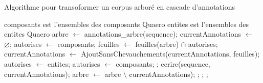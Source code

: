 \documentclass[PhD-Yoann-Dupont.tex]{subfiles}
\begin{document}
\begin{algorithm}[ht!]
\caption{Algorithme pour transoformer un corpus arboré en cascade d'annotations}
\label{alg:CorpusTreeToCascade}
\begin{algorithmic}
    \State \Comment composants est l'ensembles des composants Quaero
    \State \Comment entites est l'ensembles des entites Quaero
        \State arbre $\gets$ annotations\_arbre(sequence);
        \State currentAnnotations $\gets$ $\varnothing$;
        \State autorises $\gets$ composants;
            \State feuilles $\gets$ feuilles(arbre) $\cap$ autorises;
            \State currentAnnotations $\gets$ AjoutSansChevauchements(currentAnnotations, feuilles);
                \State autorises $\gets$ entites;
            \Else
                \State autorises $\gets$ composants;
            \EndIf;
            \State ecrire(sequence, currentAnnotations);
            \State arbre $\gets$ arbre $\setminus$ currentAnnotations);
        \EndWhile;
    \EndFor;
    \EndFunction;
\end{algorithmic}
\end{algorithm}
\end{document}
